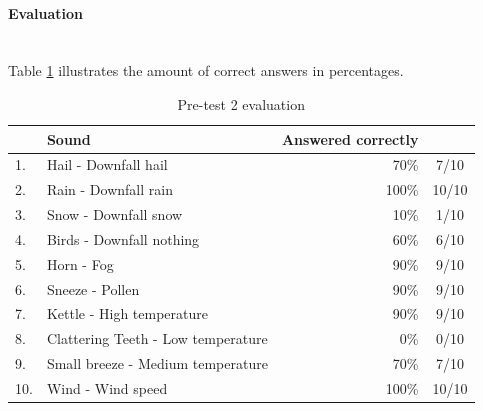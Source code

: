 \pagebreak[3]
\paragraph{Evaluation} %
\label{par:pre_test_2_evaluation}
\hspace{0pt} \\
Table \ref{tab:pre_test_2_evaluation} illustrates the amount of correct answers in percentages.

\begin{table}[!hb]
\centering
\begin{tabular}{l l r c}
   & Sound &  Answered correctly & \\
\hline
1. & Hail - Downfall hail & 70\% & 7/10 \\
2. & Rain - Downfall rain & 100\% & 10/10 \\
3. & Snow - Downfall snow & 10\% & 1/10 \\
4. & Birds - Downfall nothing & 60\% & 6/10 \\
5. & Horn - Fog & 90\% & 9/10 \\
6. & Sneeze - Pollen & 90\% & 9/10 \\
7. & Kettle - High temperature & 90\% & 9/10 \\
8. & Clattering Teeth - Low temperature & 0\% & 0/10 \\
9. & Small breeze - Medium temperature & 70\% & 7/10 \\
10. & Wind - Wind speed & 100\% & 10/10
\end{tabular}
\caption{Pre-test 2 evaluation}
\label{tab:pre_test_2_evaluation}
\end{table}

